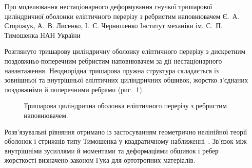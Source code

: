 \ReportHeading
  {Про моделювання нестаціонарного деформування гнучкої тришарової циліндричної оболонки еліптичного перерізу з ребристим наповнювачем}
  {Є.~А. Сторожук, А.~В. Лисенко, І.~С. Чернишенко}
  {Інститут механіки ім. С.~П. Тимошенка НАН України}
  {}

Розглянуто тришарову циліндричну оболонку еліптичного перерізу з дискретним поздовжньо-поперечним ребристим наповнювачем за дії нестаціонарного навантаження. Неоднорідна тришарова пружна структура складається із зовнішньої та внутрішньої еліптичних циліндричних обшивок, жорстко з’єднаних поздовжніми й поперечними ребрами (рис.~1).

\begin{figure}[htbp]
  \centering
  \caption{Тришарова циліндрична оболонка еліптичного перерізу з ребристим наповнювачем.}
\end{figure}

Розв’язувальні рівняння отримано із застосуванням геометрично нелінійної теорії оболонок і стрижнів типу Тимошенка у квадратичному наближенні~\cite{ribbed:golovko2012}. Зв’язок між внутрішніми зусиллями й моментами та деформаціями обшивок і ребер жорсткості визначено законом Гука для ортотропних матеріалів.

